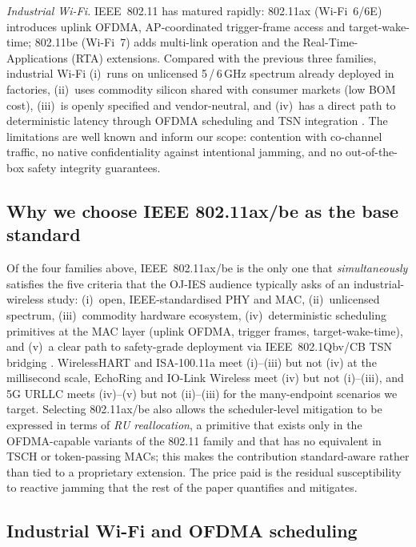 \documentclass[journal,onecolumn,11pt,a4paper]{IEEEtran}
\begin{document}
\emph{Industrial Wi-Fi.}
IEEE~802.11 has matured rapidly: 802.11ax (Wi-Fi~6/6E)
\cite{Kho19,Tut21} introduces uplink OFDMA, AP-coordinated
trigger-frame access and target-wake-time; 802.11be (Wi-Fi~7)
\cite{Lop19,Den20} adds multi-link operation and the
Real-Time-Applications (RTA) extensions. Compared with the
previous three families, industrial Wi-Fi (i)~runs on unlicensed
5\,/\,6\,GHz spectrum already deployed in factories, (ii)~uses
commodity silicon shared with consumer markets (low BOM cost),
(iii)~is openly specified and vendor-neutral, and (iv)~has a
direct path to deterministic latency through OFDMA scheduling and
TSN integration \cite{IEEE802Qbv,IEEE802CB,TSN5G25}. The
limitations are well known and inform our scope: contention with
co-channel traffic, no native confidentiality against intentional
jamming, and no out-of-the-box safety integrity guarantees.

\subsection{Why we choose IEEE 802.11ax/be as the base standard}
\label{sec:related-why-wifi}

Of the four families above, IEEE~802.11ax/be is the only one that
\emph{simultaneously} satisfies the five criteria that
the OJ-IES audience typically asks of an industrial-wireless
study: (i)~open, IEEE-standardised PHY and MAC, (ii)~unlicensed
spectrum, (iii)~commodity hardware ecosystem, (iv)~deterministic
scheduling primitives at the MAC layer (uplink OFDMA, trigger
frames, target-wake-time), and (v)~a clear path to safety-grade
deployment via IEEE~802.1Qbv/CB TSN bridging
\cite{IEEE802Qbv,IEEE802CB}. WirelessHART and ISA-100.11a meet
(i)--(iii) but not (iv) at the millisecond scale, EchoRing and
IO-Link Wireless meet (iv) but not (i)--(iii), and 5G URLLC
\cite{Pop20,TS22104} meets (iv)--(v) but not (ii)--(iii) for the
many-endpoint scenarios we target. Selecting 802.11ax/be also
allows the scheduler-level mitigation to be expressed in terms of
\emph{RU reallocation}, a primitive that exists only in the
OFDMA-capable variants of the 802.11 family and that has no
equivalent in TSCH or token-passing MACs; this makes the
contribution standard-aware rather than tied to a proprietary
extension. The price paid is the residual susceptibility to
reactive jamming that the rest of the paper quantifies and
mitigates.

\subsection{Industrial Wi-Fi and OFDMA scheduling}
\label{sec:related-wifi-ofdma}
\end{document}

